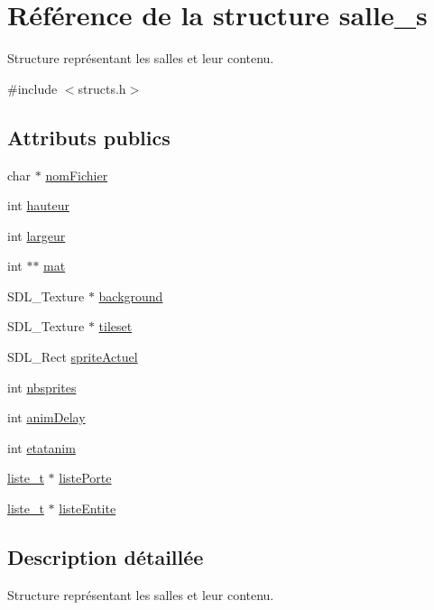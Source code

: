 \hypertarget{structsalle__s}{}\section{Référence de la structure salle\+\_\+s}
\label{structsalle__s}


Structure représentant les salles et leur contenu.  




{\ttfamily \#include $<$structs.\+h$>$}

\subsection*{Attributs publics}
\begin{DoxyCompactItemize}
\item 
char $\ast$ \hyperlink{structsalle__s_a12e47589795f5ed60109cf2b073ec671}{nom\+Fichier}
\item 
int \hyperlink{structsalle__s_a2be13fedfc5f31bc7f02c65af7d95c7a}{hauteur}
\item 
int \hyperlink{structsalle__s_ac1273e8d176620c3b9130d2f1e741315}{largeur}
\item 
int $\ast$$\ast$ \hyperlink{structsalle__s_ad9934630b58b551f8f185dead2006ba6}{mat}
\item 
S\+D\+L\+\_\+\+Texture $\ast$ \hyperlink{structsalle__s_a5ef73bdeb5f07b6c8b4978dcf265d0d2}{background}
\item 
S\+D\+L\+\_\+\+Texture $\ast$ \hyperlink{structsalle__s_a44a7c08d109019af0e4877e488cef708}{tileset}
\item 
S\+D\+L\+\_\+\+Rect \hyperlink{structsalle__s_ad8bdafa725de50b0b00688980c362d74}{sprite\+Actuel}
\item 
int \hyperlink{structsalle__s_afd28b0ea2bb7eb7e8ad6b915fc8c59e7}{nbsprites}
\item 
int \hyperlink{structsalle__s_a3a3512a26fd8960cda702e9225937193}{anim\+Delay}
\item 
int \hyperlink{structsalle__s_a6ac170caff770f795abb7b6a79e84cc7}{etatanim}
\item 
\hyperlink{structliste__s}{liste\+\_\+t} $\ast$ \hyperlink{structsalle__s_a8c3b513a26b2418863a37bfd91f86b11}{liste\+Porte}
\item 
\hyperlink{structliste__s}{liste\+\_\+t} $\ast$ \hyperlink{structsalle__s_a6c6c65ac4a856dbf75a104081e839b96}{liste\+Entite}
\end{DoxyCompactItemize}


\subsection{Description détaillée}
Structure représentant les salles et leur contenu. 

